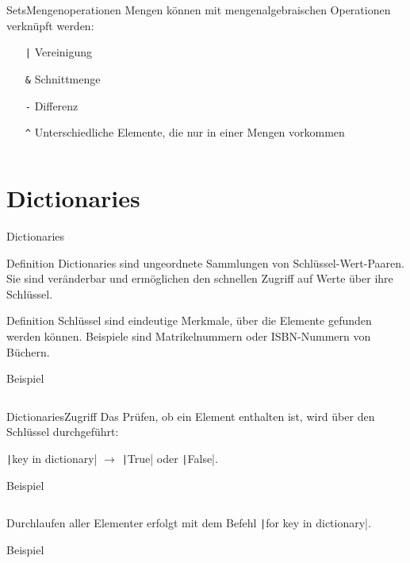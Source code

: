 \documentclass[xelatex,aspectratio=169]{beamer}
\begin{document}
\begin{frame}{Sets}{Mengenoperationen}
    Mengen können mit mengenalgebraischen Operationen verknüpft werden:
    \begin{itemize}
        \item [\texttt{|}] Vereinigung
        \item [\texttt{\&}] Schnittmenge
        \item [\texttt{-}] Differenz
        \item [\texttt{\^}] Unterschiedliche Elemente, die nur in einer Mengen vorkommen
    \end{itemize}

    \inputminted[lastline=7]{python}{src/sets_operations.py}

\end{frame}

\section{Dictionaries}

\begin{frame}{Dictionaries}
    \begin{block}{Definition}
        Dictionaries sind ungeordnete Sammlungen von Schlüssel-Wert-Paaren. Sie sind veränderbar und ermöglichen den schnellen Zugriff auf Werte über ihre Schlüssel.
    \end{block}

    \begin{block}{Definition}
        Schlüssel sind eindeutige Merkmale, über die Elemente gefunden werden können. Beispiele sind Matrikelnummern oder ISBN-Nummern von Büchern.
    \end{block}

    \begin{exampleblock}{Beispiel}
        \inputminted[lastline=6]{python}{src/dictionaries_overview.py}
    \end{exampleblock}
\end{frame}

\begin{frame}{Dictionaries}{Zugriff}
    Das Prüfen, ob ein Element enthalten ist, wird über den Schlüssel durchgeführt:

    \texttt|key in dictionary| $\rightarrow$ \texttt|True| oder \texttt|False|.\\

    \begin{exampleblock}{Beispiel}
        \inputminted[firstline=8,lastline=9]{python}{src/dictionaries_overview.py}
    \end{exampleblock}

    Durchlaufen aller Elementer erfolgt mit dem Befehl \texttt|for key in dictionary|.

    \begin{exampleblock}{Beispiel}
        \inputminted[firstline=11,lastline=12]{python}{src/dictionaries_overview.py}
    \end{exampleblock}

\end{frame}
\end{document}

